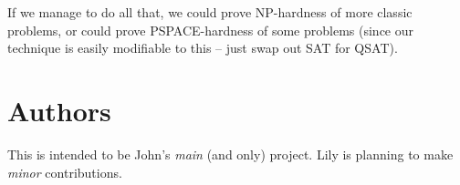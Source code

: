 \documentclass{article}
\begin{document}
If we manage to do all that, we could prove NP-hardness of more classic
problems, or could prove PSPACE-hardness of some problems (since our technique
is easily modifiable to this -- just swap out SAT for QSAT).

\section{Authors}

This is intended to be John's \emph{main} (and only) project. Lily is planning
to make \emph{minor} contributions.

\printbibliography
\end{document}
